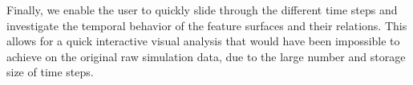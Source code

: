 %
Finally, we enable the user to quickly slide through the different time steps
and investigate the temporal behavior of the feature surfaces and their
relations.
%
This allows for a quick interactive visual analysis that would have been
impossible to achieve on the original raw simulation data, due to the large
number and storage size of time steps.
%


%